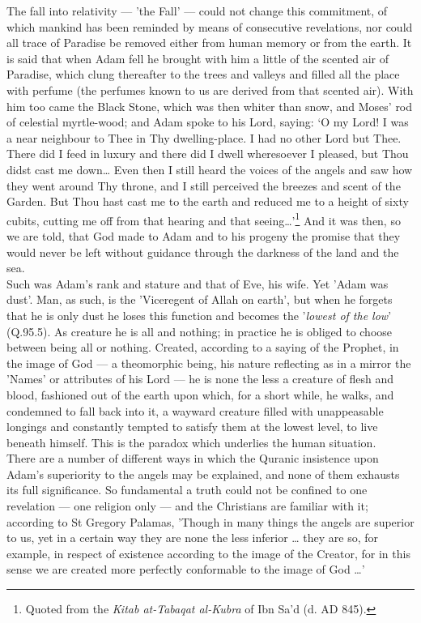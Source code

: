 \documentclass[10pt, twoside]{book}
\begin{document}
The fall into relativity --- 'the Fall' --- could not change this commitment, of which mankind has been 
reminded by means of consecutive revelations, nor could all trace of Paradise be removed either from 
human memory or from the earth. It is said that when Adam fell he brought with him a little of the 
scented air of Paradise, which clung thereafter to the trees and valleys and filled all the place 
with perfume (the perfumes known to us are derived from that scented air). With him too came the 
Black Stone, which was then whiter than snow, and Moses' rod of celestial myrtle\hyp{}wood; and Adam spoke 
to his Lord, saying: `O my Lord! I was a near neighbour to Thee in Thy dwelling\hyp{}place. I had no other 
Lord but Thee. There did I feed in luxury and there did I dwell wheresoever I pleased, but Thou didst 
cast me down\ldots{} Even then I still heard the voices of the angels and saw how they went around Thy 
throne, and I still perceived the breezes and scent of the Garden. But Thou hast cast me to the earth 
and reduced me to a height of sixty cubits, cutting me off from that hearing and that seeing\ldots{}'\footnote{Quoted from the \emph{Kitab at\hyp{}Tabaqat al\hyp{}Kubra} of Ibn Sa'd (d. AD 845).}
And it was then, so we are told, that God made to Adam and to his progeny the promise that they would 
never be left without guidance through the darkness of the land and the sea. \\

Such was Adam's rank and stature and that of Eve, his wife. Yet 'Adam was dust'. Man, as such, is the 
'Viceregent of Allah on earth', but when he forgets that he is only dust he loses this function and 
becomes the '\emph{lowest of the low}' (Q.95.5). As creature he is all and nothing; in practice he is obliged 
to choose between being all or nothing. Created, according to a saying of the Prophet, in the image 
of God --- a theomorphic being, his nature reflecting as in a mirror the 'Names' or attributes of his 
Lord --- he is none the less a creature of flesh and blood, fashioned out of the earth upon which, for 
a short while, he walks, and condemned to fall back into it, a wayward creature filled with 
unappeasable longings and constantly tempted to satisfy them at the lowest level, to live beneath 
himself. This is the paradox which underlies the human situation. \\

There are a number of different ways in which the Quranic insistence upon Adam's superiority to the 
angels may be explained, and none of them exhausts its full significance. So fundamental a truth 
could not be confined to one revelation --- one religion only --- and the Christians are familiar with 
it; according to St Gregory Palamas, 'Though in many things the angels are superior to us, yet in a 
certain way they are none the less inferior \ldots{} they are so, for example, in respect of existence 
according to the image of the Creator, for in this sense we are created more perfectly conformable to 
the image of God \ldots{}' \\
\end{document}
